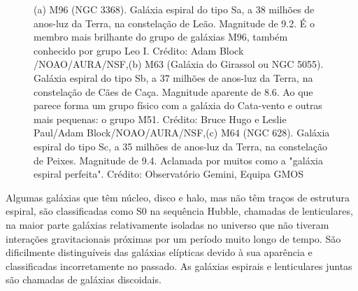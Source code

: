 \begin{figure}[ht!] 
\centering 
{} 
\qquad 
{} 
\qquad 
{} 
\caption{(a) M96 (NGC 3368). Galáxia espiral do tipo Sa, a 38 milhões de anos-luz da Terra, na constelação de Leão. Magnitude de 9.2. É o membro mais brilhante do grupo de galáxias M96, também conhecido por grupo Leo I. Crédito: Adam Block /NOAO/AURA/NSF,\newline (b) M63 (Galáxia do Girassol ou NGC 5055). Galáxia espiral do tipo Sb, a 37 milhões de anos-luz da Terra, na constelação de Cães de Caça. Magnitude aparente de 8.6. Ao que parece forma um grupo físico com a galáxia do Cata-vento e outras mais pequenas: o grupo M51. Crédito: Bruce Hugo e Leslie Paul/Adam Block/NOAO/AURA/NSF,\newline (c) M64 (NGC 628). Galáxia espiral do tipo Sc, a 35 milhões de anos-luz da Terra, na constelação de Peixes. Magnitude de 9.4. Aclamada por muitos como a "galáxia espiral perfeita". Crédito: Observatório Gemini, Equipa GMOS} 
\label{fig:galáxiasElipticas3} 
\end{figure} 

Algumas galáxias que têm núcleo, disco e halo, mas não têm traços de estrutura espiral, são classificadas como S0 na sequência Hubble, chamadas de lenticulares, na maior parte galáxias relativamente isoladas no universo que não tiveram interações gravitacionais próximas por um período muito longo de tempo. São dificilmente distinguíveis das galáxias elípticas devido à sua aparência e classificadas incorretamente no passado. As galáxias espirais e lenticulares juntas são chamadas de galáxias discoidais. 

